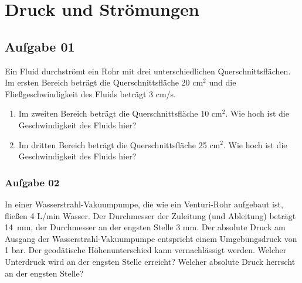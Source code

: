 \documentclass[nobib]{tufte-book}
\begin{document}
 \setcounter{page}{0}
\setcounter{chapter}{0}
\chapter{Druck und Strömungen}

\section*{Aufgabe 01}
Ein Fluid durchströmt ein Rohr mit drei unterschiedlichen Querschnittsflächen. 
Im ersten Bereich beträgt die Querschnittsfläche 20 cm$^2$ und die Fließgeschwindigkeit des Fluids beträgt 3 cm/s.
\begin{enumerate}
\item Im zweiten Bereich beträgt die Querschnittsfläche 10 cm$^2$. Wie hoch ist die Geschwindigkeit des Fluids hier?
\item Im dritten Bereich beträgt die Querschnittsfläche 25 cm$^2$. Wie hoch ist die Geschwindigkeit des Fluids hier?

\end{enumerate}


%
%



\subsection*{Aufgabe 02}

In einer Wasserstrahl-Vakuumpumpe, die wie ein Venturi-Rohr aufgebaut ist, fließen 4 L/min Wasser. Der Durchmesser der Zuleitung (und Ableitung) beträgt \mbox{14 mm}, der Durchmesser an der engsten Stelle 3 mm. Der absolute Druck am Ausgang der Wasserstrahl-Vakuumpumpe entspricht einem Umgebungsdruck von 1 bar. Der geodätische Höhenunterschied kann vernachlässigt werden. 
Welcher Unterdruck wird an der engsten Stelle erreicht? Welcher absolute Druck herrscht an der engsten Stelle?
\end{document}
